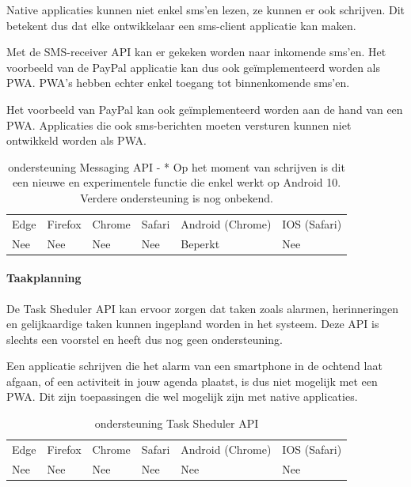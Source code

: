 Native applicaties kunnen niet enkel sms’en lezen, ze kunnen er ook schrijven. Dit betekent dus dat elke ontwikkelaar een sms-client applicatie kan maken.

Met de SMS-receiver API \autocite{Fullea2020} kan er gekeken worden naar inkomende sms’en. Het voorbeeld van de PayPal applicatie kan dus ook geïmplementeerd worden als PWA. PWA’s hebben echter enkel toegang tot binnenkomende sms’en. 

Het voorbeeld van PayPal kan ook geïmplementeerd worden aan de hand van een PWA. Applicaties die ook sms-berichten moeten versturen kunnen niet ontwikkeld worden als PWA.

\begin{table}[H]
	\centering
	\begin{tabular}{llllll}
		Edge & Firefox & Chrome & Safari & Android (Chrome) & IOS (Safari) \\
		Nee   & Nee      &  Nee     & Nee     & Beperkt               & Nee          
	\end{tabular}	
	\caption{ondersteuning Messaging API - * Op het moment van schrijven is dit een nieuwe en experimentele functie die enkel werkt op 
	Android 10. Verdere ondersteuning is nog onbekend.
	}
	\label{ondersteuning Messaging API}
\end{table}	



\paragraph{Taakplanning}
De Task Sheduler API \autocite{Kulkarni2020} kan ervoor zorgen dat taken zoals alarmen, herinneringen en gelijkaardige taken kunnen ingepland worden in het systeem. Deze API is slechts een voorstel en heeft dus nog geen ondersteuning.

Een applicatie schrijven die het alarm van een smartphone in de ochtend laat afgaan, of een activiteit in jouw agenda plaatst, is dus niet mogelijk met een PWA. Dit zijn toepassingen die wel mogelijk zijn met native applicaties.

\begin{table}[H]
	\centering
	\begin{tabular}{llllll}
		Edge & Firefox & Chrome & Safari & Android (Chrome) & IOS (Safari) \\
		Nee   & Nee      &  Nee     & Nee     & Nee               & Nee          
	\end{tabular}	
	\caption{ondersteuning Task Sheduler API }
	\label{ondersteuning Task Sheduler API}
\end{table}	



